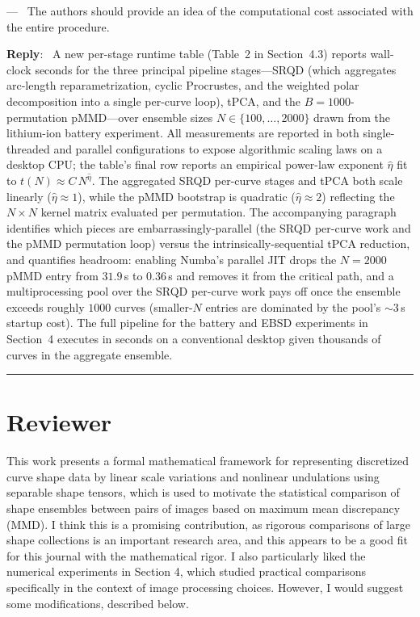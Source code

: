 \documentclass[11pt]{article}
\newcounter{reviewer}
\newcounter{point}[reviewer]
\renewcommand{\thepoint}{Comment\,\thereviewer.\arabic{point}}
\newcommand{\reviewersection}{\stepcounter{reviewer} \bigskip \hrule
                  \section*{Reviewer \thereviewer}}
\newenvironment{point}
   {\refstepcounter{point} \bigskip \noindent {\textbf{Reviewer~\thepoint} } ---\ }
   {\par }
\newenvironment{reply}
   {\medskip \noindent \color{blue} \begin{sf}\textbf{Reply}:\  }
   {\medskip \par \end{sf}}
\begin{document}
\begin{point}
The authors should provide an idea of the computational cost associated with the entire procedure.
\end{point}
\begin{reply}
A new per-stage runtime table (Table~2 in Section~4.3) reports wall-clock seconds for the three principal pipeline stages---SRQD (which aggregates arc-length reparametrization, cyclic Procrustes, and the weighted polar decomposition into a single per-curve loop), tPCA, and the $B=1000$-permutation pMMD---over ensemble sizes $N\in\{100,\dots,2000\}$ drawn from the lithium-ion battery experiment. All measurements are reported in both single-threaded and parallel configurations to expose algorithmic scaling laws on a desktop CPU; the table's final row reports an empirical power-law exponent $\widehat{\eta}$ fit to $t(N)\approx C\,N^{\widehat{\eta}}$. The aggregated SRQD per-curve stages and tPCA both scale linearly ($\widehat{\eta}\approx 1$), while the pMMD bootstrap is quadratic ($\widehat{\eta}\approx 2$) reflecting the $N\times N$ kernel matrix evaluated per permutation. The accompanying paragraph identifies which pieces are embarrassingly-parallel (the SRQD per-curve work and the pMMD permutation loop) versus the intrinsically-sequential tPCA reduction, and quantifies headroom: enabling Numba's parallel JIT drops the $N{=}2000$ pMMD entry from $31.9$\,s to $0.36$\,s and removes it from the critical path, and a multiprocessing pool over the SRQD per-curve work pays off once the ensemble exceeds roughly $1000$ curves (smaller-$N$ entries are dominated by the pool's $\sim 3$\,s startup cost). The full pipeline for the battery and EBSD experiments in Section~4 executes in seconds on a conventional desktop given thousands of curves in the aggregate ensemble.
\end{reply}

\reviewersection

This work presents a formal mathematical framework for representing discretized curve shape data by linear scale variations and nonlinear undulations using separable shape tensors, which is used to motivate the statistical comparison of shape ensembles between pairs of images based on maximum mean discrepancy (MMD).  I think this is a promising contribution, as rigorous comparisons of large shape collections is an important research area, and this appears to be a good fit for this journal with the mathematical rigor. I also particularly liked the numerical experiments in Section 4, which studied practical comparisons specifically in the context of image processing choices. However, I would suggest some modifications, described below.
\end{document}
